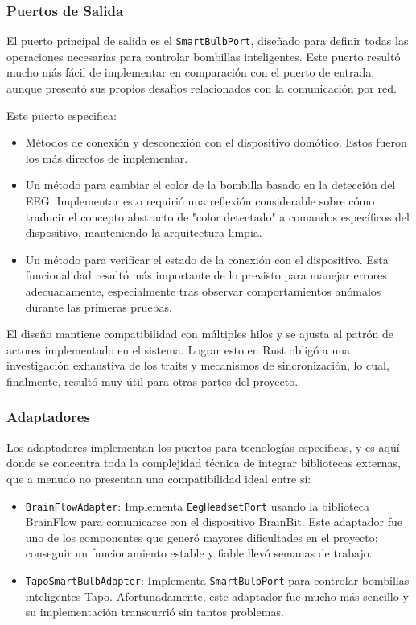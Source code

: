 \subsubsection{Puertos de Salida}

El puerto principal de salida es el \texttt{SmartBulbPort}, diseñado para definir todas las operaciones necesarias para controlar bombillas inteligentes. Este puerto resultó mucho más fácil de implementar en comparación con el puerto de entrada, aunque presentó sus propios desafíos relacionados con la comunicación por red.

Este puerto especifica:

\begin{itemize}
    \item Métodos de conexión y desconexión con el dispositivo domótico. Estos fueron los más directos de implementar.
    \item Un método para cambiar el color de la bombilla basado en la detección del EEG. Implementar esto requirió una reflexión considerable sobre cómo traducir el concepto abstracto de "color detectado" a comandos específicos del dispositivo, manteniendo la arquitectura limpia.
    \item Un método para verificar el estado de la conexión con el dispositivo. Esta funcionalidad resultó más importante de lo previsto para manejar errores adecuadamente, especialmente tras observar comportamientos anómalos durante las primeras pruebas.
\end{itemize}

El diseño mantiene compatibilidad con múltiples hilos y se ajusta al patrón de actores implementado en el sistema. Lograr esto en Rust obligó a una investigación exhaustiva de los traits y mecanismos de sincronización, lo cual, finalmente, resultó muy útil para otras partes del proyecto.

\subsubsection{Adaptadores}

Los adaptadores implementan los puertos para tecnologías específicas, y es aquí donde se concentra toda la complejidad técnica de integrar bibliotecas externas, que a menudo no presentan una compatibilidad ideal entre sí:

\begin{itemize}
    \item \texttt{BrainFlowAdapter}: Implementa \texttt{EegHeadsetPort} usando la biblioteca BrainFlow para comunicarse con el dispositivo BrainBit. Este adaptador fue uno de los componentes que generó mayores dificultades en el proyecto; conseguir un funcionamiento estable y fiable llevó semanas de trabajo.
    \item \texttt{TapoSmartBulbAdapter}: Implementa \texttt{SmartBulbPort} para controlar bombillas inteligentes Tapo. Afortunadamente, este adaptador fue mucho más sencillo y su implementación transcurrió sin tantos problemas.
\end{itemize}

